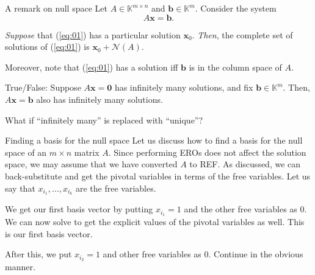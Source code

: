 \documentclass[dvipsnames]{beamer}
\theoremstyle{definition}
\begin{document}
\begin{frame}{A remark on null space}
    Let $A \in \mathbb{K}^{m \times n}$ and $\mathbf{b} \in \mathbb{K}^{m}$. Consider the system
    \begin{equation} \label{eq:01} \tag{$\ast$}
        A \mathbf{x} = \mathbf{b}.
    \end{equation} \pause

    \emph{Suppose} that (\ref{eq:01}) has a particular solution $\mathbf{x}_{0}$. \pause \emph{Then}, the complete set of solutions of (\ref{eq:01}) is $\mathbf{x}_{0} + \mathcal{N}(A)$. \pause

    Moreover, note that (\ref{eq:01}) has a solution iff $\mathbf{b}$ is in the column space of $A$. \pause

    True/False: Suppose $A \mathbf{x} = \mathbf{0}$ has infinitely many solutions, and fix $\mathbf{b} \in \mathbb{K}^{m}$. Then, $A \mathbf{x} = \mathbf{b}$ also has infinitely many solutions. \pause

    What if ``infinitely many'' is replaced with ``unique''?
\end{frame}
\begin{frame}{Finding a basis for the null space}
    Let us discuss how to find a basis for the null space of an $m \times n$ matrix $A$. \pause Since performing EROs does not affect the solution space, we may assume that we have converted $A$ to REF. \pause As discussed, we can back-substitute and get the pivotal variables in terms of the free variables. \pause Let us say that $x_{i_{1}}, \ldots, x_{i_{k}}$ are the free variables. \pause

    We get our first basis vector by putting $x_{i_{1}} = 1$ and the other free variables as $0$. \pause We can now solve to get the explicit values of the pivotal variables as well. \pause This is our first basis vector. \pause

    After this, we put $x_{i_{2}} = 1$ and other free variables as $0$. \pause Continue in the obvious manner.
\end{frame}
\end{document}
